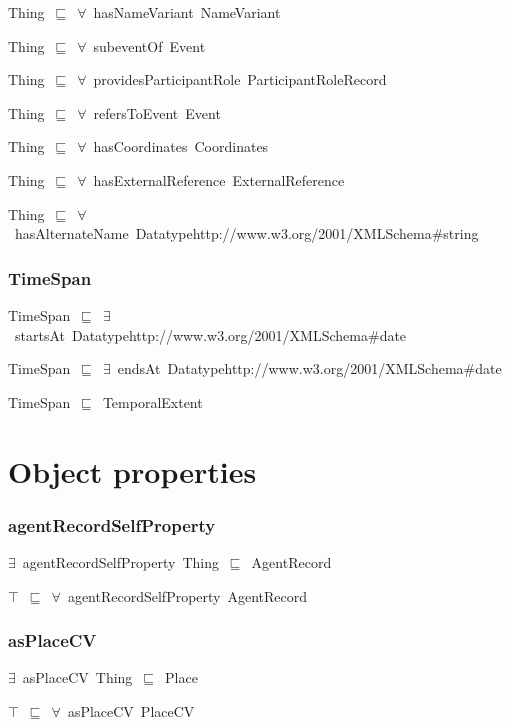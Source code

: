 \documentclass{article}
\begin{document}
Thing~\ensuremath{\sqsubseteq}~\ensuremath{\forall}~hasNameVariant~NameVariant~

Thing~\ensuremath{\sqsubseteq}~\ensuremath{\forall}~subeventOf~Event~

Thing~\ensuremath{\sqsubseteq}~\ensuremath{\forall}~providesParticipantRole~ParticipantRoleRecord~

Thing~\ensuremath{\sqsubseteq}~\ensuremath{\forall}~refersToEvent~Event~

Thing~\ensuremath{\sqsubseteq}~\ensuremath{\forall}~hasCoordinates~Coordinates~

Thing~\ensuremath{\sqsubseteq}~\ensuremath{\forall}~hasExternalReference~ExternalReference~

Thing~\ensuremath{\sqsubseteq}~\ensuremath{\forall}~hasAlternateName~Datatypehttp://www.w3.org/2001/XMLSchema#string~

\subsubsection*{TimeSpan}

TimeSpan~\ensuremath{\sqsubseteq}~\ensuremath{\exists}~startsAt~Datatypehttp://www.w3.org/2001/XMLSchema#date~

TimeSpan~\ensuremath{\sqsubseteq}~\ensuremath{\exists}~endsAt~Datatypehttp://www.w3.org/2001/XMLSchema#date~

TimeSpan~\ensuremath{\sqsubseteq}~TemporalExtent~

\section*{Object properties}\subsubsection*{agentRecordSelfProperty}

\ensuremath{\exists}~agentRecordSelfProperty~Thing~\ensuremath{\sqsubseteq}~AgentRecord

\ensuremath{\top}~\ensuremath{\sqsubseteq}~\ensuremath{\forall}~agentRecordSelfProperty~AgentRecord

\subsubsection*{asPlaceCV}

\ensuremath{\exists}~asPlaceCV~Thing~\ensuremath{\sqsubseteq}~Place

\ensuremath{\top}~\ensuremath{\sqsubseteq}~\ensuremath{\forall}~asPlaceCV~PlaceCV
\end{document}
